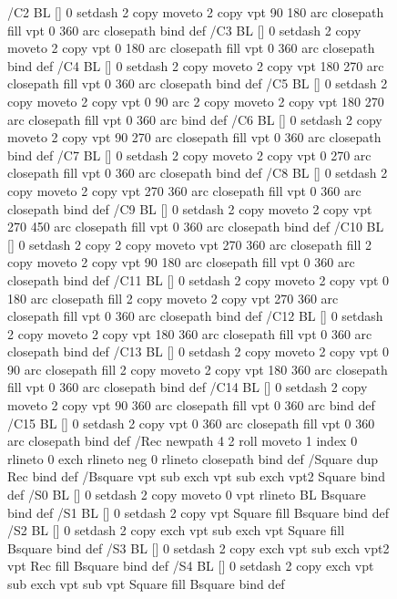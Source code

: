 \documentclass{LMCS}
\begin{document}
\begin{figure}[!tbp]
{{{/C2 { BL [] 0 setdash 2 copy moveto
       2 copy  vpt 90 180 arc closepath fill
               vpt 0 360 arc closepath } bind def
/C3 { BL [] 0 setdash 2 copy moveto
       2 copy  vpt 0 180 arc closepath fill
               vpt 0 360 arc closepath } bind def
/C4 { BL [] 0 setdash 2 copy moveto
       2 copy  vpt 180 270 arc closepath fill
               vpt 0 360 arc closepath } bind def
/C5 { BL [] 0 setdash 2 copy moveto
       2 copy  vpt 0 90 arc
       2 copy moveto
       2 copy  vpt 180 270 arc closepath fill
               vpt 0 360 arc } bind def
/C6 { BL [] 0 setdash 2 copy moveto
      2 copy  vpt 90 270 arc closepath fill
              vpt 0 360 arc closepath } bind def
/C7 { BL [] 0 setdash 2 copy moveto
      2 copy  vpt 0 270 arc closepath fill
              vpt 0 360 arc closepath } bind def
/C8 { BL [] 0 setdash 2 copy moveto
      2 copy vpt 270 360 arc closepath fill
              vpt 0 360 arc closepath } bind def
/C9 { BL [] 0 setdash 2 copy moveto
      2 copy  vpt 270 450 arc closepath fill
              vpt 0 360 arc closepath } bind def
/C10 { BL [] 0 setdash 2 copy 2 copy moveto vpt 270 360 arc closepath fill
       2 copy moveto
       2 copy vpt 90 180 arc closepath fill
               vpt 0 360 arc closepath } bind def
/C11 { BL [] 0 setdash 2 copy moveto
       2 copy  vpt 0 180 arc closepath fill
       2 copy moveto
       2 copy  vpt 270 360 arc closepath fill
               vpt 0 360 arc closepath } bind def
/C12 { BL [] 0 setdash 2 copy moveto
       2 copy  vpt 180 360 arc closepath fill
               vpt 0 360 arc closepath } bind def
/C13 { BL [] 0 setdash  2 copy moveto
       2 copy  vpt 0 90 arc closepath fill
       2 copy moveto
       2 copy  vpt 180 360 arc closepath fill
               vpt 0 360 arc closepath } bind def
/C14 { BL [] 0 setdash 2 copy moveto
       2 copy  vpt 90 360 arc closepath fill
               vpt 0 360 arc } bind def
/C15 { BL [] 0 setdash 2 copy vpt 0 360 arc closepath fill
               vpt 0 360 arc closepath } bind def
/Rec   { newpath 4 2 roll moveto 1 index 0 rlineto 0 exch rlineto
       neg 0 rlineto closepath } bind def
/Square { dup Rec } bind def
/Bsquare { vpt sub exch vpt sub exch vpt2 Square } bind def
/S0 { BL [] 0 setdash 2 copy moveto 0 vpt rlineto BL Bsquare } bind def
/S1 { BL [] 0 setdash 2 copy vpt Square fill Bsquare } bind def
/S2 { BL [] 0 setdash 2 copy exch vpt sub exch vpt Square fill Bsquare } bind def
/S3 { BL [] 0 setdash 2 copy exch vpt sub exch vpt2 vpt Rec fill Bsquare } bind def
/S4 { BL [] 0 setdash 2 copy exch vpt sub exch vpt sub vpt Square fill Bsquare } bind def
}}}
\end{figure}
\end{document}
